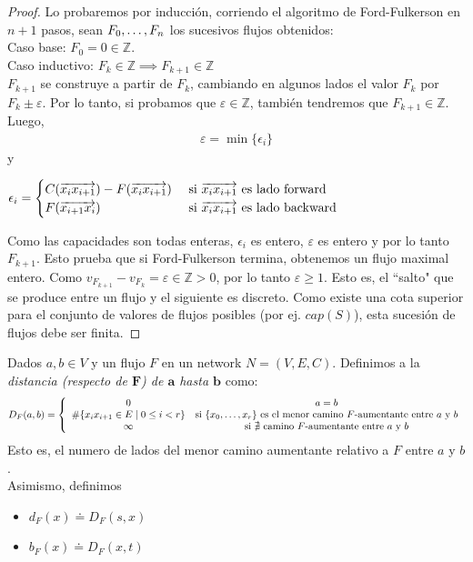 \begin{proof}
Lo probaremos por inducción, corriendo el algoritmo de Ford-Fulkerson en $n+1$ pasos, sean $F_0, \mathellipsis, F_n$ los sucesivos flujos obtenidos:\\
Caso base: $F_0 = 0 \in \mathbb{Z}$.\\
Caso inductivo:
$F_k \in \mathbb{Z} \implies F_{k+1} \in \mathbb{Z}$\\
$F_{k+1}$ se construye a partir de $F_k$, cambiando en algunos lados el valor $F_k$ por $F_k \pm \varepsilon$. Por lo tanto, si probamos que $\varepsilon \in \mathbb{Z}$, también tendremos que $F_{k+1} \in \mathbb{Z}$. Luego,
\begin{align}
    \varepsilon = \min\{\epsilon_i\}
\end{align}
y \begin{center}
    $\epsilon_i = \begin{cases} C(\overrightarrow{x_i x_{i+1}}) - F(\overrightarrow{x_i x_{i+1}}) & \text{ si } \overrightarrow{x_i x_{i+1}} \text{ es lado forward}\\
    F(\overrightarrow{x_{i+1} x_i}) & \text{ si } \overrightarrow{x_i x_{i+1}} \text{ es lado backward}
    \end{cases}$
\end{center}
Como las capacidades son todas enteras, $\epsilon_i$ es entero, $\varepsilon$  es entero y por lo tanto $F_{k+1}$.
Esto prueba que si Ford-Fulkerson termina, obtenemos un flujo maximal entero.
Como $v_{F_{k+1}} - v_{F_k} = \varepsilon \in \mathbb{Z} > 0$, por lo tanto $\varepsilon \ge 1$. Esto es, el ``salto" que se produce entre un flujo y el siguiente es discreto.
Como existe una cota superior para el conjunto de valores de flujos posibles (por ej. $cap(S)$), esta sucesión de flujos debe ser finita. 
\end{proof}

\begin{definition}
Dados $a,b\in V$ y un flujo $F$ en un network $N = (V,E,C)$. Definimos a la \emph{distancia (respecto de $\boldsymbol{F}$) de $\boldsymbol{a}$ hasta $\boldsymbol{b}$} como:
\begin{align}
D_F(a,b) = \left\{
    \begin{array}{cc}
         0 & a = b\\
         \#\{x_i x_{i+1} \in E\mid 0\le i < r \}  &\text{si $\{x_0, \mathellipsis, x_r\}$ es el menor camino $F$-aumentante entre $a$ y $b$} \\ 
         \infty &\text{si $\nexists$ camino $F$-aumentante entre $a$ y $b$}
    \end{array}
    \right.
\end{align}
Esto es, el numero de lados del menor camino aumentante relativo a $F$ entre $a$ y $b$.\\
Asimismo, definimos
\begin{itemize}
    \item $d_F(x) \doteq D_F(s,x)$
    \item $b_F(x) \doteq D_F(x,t)$
\end{itemize}
\end{definition}

